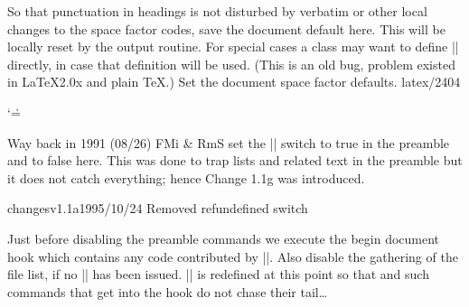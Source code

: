  So that punctuation in headings is not disturbed by verbatim
 or other local changes to the space factor codes, save the document
 default here. This will be locally reset by the output routine.
 For special cases a class may want to define |\normalsfcodes|
 directly, in case that definition will be used.
 (This is an old bug, problem existed in \LaTeX2.0x and plain \TeX.)
            {Set the document space factor defaults. latex/2404}
    \begin{teX}
  \ifx\normalsfcodes\@empty
    \ifnum\sfcode`\.=\@m
      \let\normalsfcodes\frenchspacing
    \else
      \let\normalsfcodes\nonfrenchspacing
    \fi
  \fi
 \end{teX}

 Way back in 1991 (08/26) FMi \& RmS set the |\@noskipsec| switch
 to true in the preamble and to false here.
 This was done to trap lists and related text in the preamble but it
 does not catch everything; hence Change 1.1g was introduced.
    \begin{teX}
  \@noskipsecfalse
    \end{teX}


 changes{v1.1a}{1995/10/24}
           {Removed refundefined switch}
  \begin{teX}
  \let \@refundefined \relax
  \end{teX}

    Just before disabling the preamble commands we execute the begin
    document hook which contains any code contributed by
    |\AtBeginDocument|. Also disable the gathering of the file list,
    if no |\listfiles| has been issued. |\AtBeginDocument| is redefined
    at this point so that and such commands that get into the hook do
    not chase their tail\ldots

  \begin{teX}
  \let\AtBeginDocument\@firstofone
  \@begindocumenthook
  \end{teX}


